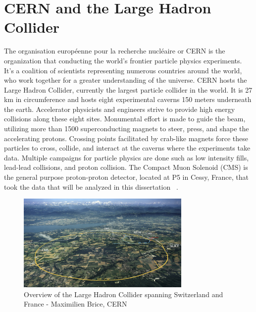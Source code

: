 \section{CERN and the Large Hadron Collider}
The organisation européenne pour la recherche nucléaire or CERN is the organization that conducting the world's frontier particle physics experiments. It's a coalition of scientists representing numerous countries around the world, who work together for a greater understanding of the universe. CERN hosts the Large Hadron Collider, currently the largest particle collider in the world. It is 27 km in circumference and hosts eight experimental caverns 150 meters underneath the earth. Accelerator physicists and engineers strive to provide high energy collisions along these eight sites. Monumental effort is made to guide the beam, utilizing more than 1500 superconducting magnets to steer, press, and shape the accelerating protons. Crossing points facilitated by crab-like magnets force these particles to cross, collide, and interact at the caverns where the experiments take data. Multiple campaigns for particle physics are done such as low intensity fills, lead-lead collisions, and proton collision. The Compact Muon Solenoid (CMS) is the general purpose proton-proton detector, located at P5 in Cessy, France, that took the data that will be analyzed in this dissertation ~\cite{Bruning:782076}. 

\begin{figure}[ht!b]
  \centering
\includegraphics[width=0.75\textwidth]{figures/LHC_map-s.jpg}    
    \caption{\label{fig:lhc} Overview of the Large Hadron Collider spanning Switzerland and France - Maximilien Brice, CERN }
\end{figure}

